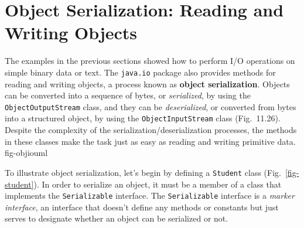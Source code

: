 
\section{Object Serialization: Reading and Writing Objects}
\label{object-serialization-readingand-writing-objects}


\noindent The examples in the previous sections showed how to perform I/O operations
on simple binary data or text.  The {\tt java.io} package also
provides methods for reading and writing objects, a process known as
{\bf object serialization}. Objects can be 
converted into a sequence of bytes, or {\it serialized}, by  using the
{\tt ObjectOutputStream} class, and they can be {\it deserialized}, or
converted from bytes into a structured object, by 
using the {\tt ObjectInputStream} class
(Fig.~11.26). Despite the complexity of the
serialization/deserialization processes, the methods in these classes
make the task just as easy as reading and writing primitive data.
{fig-objiouml}


To illustrate object serialization, let's begin by defining a
{\tt Student} class (Fig.~\ref{fig-student}).  In order to serialize an
object, it must be a member of a class that implements the
{\tt Serializable} interface.  The {\tt Serializable} interface is a {\it
marker interface}, an interface that doesn't define any methods or
constants but just serves to designate whether an object can be
serialized or not.

